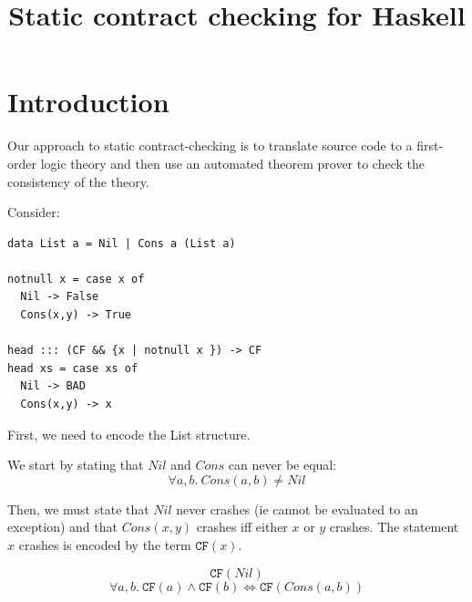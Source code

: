 \documentclass[preprint]{sigplanconf}
\begin{document}
\newcommand{\etrans}[1]{\mathcal{E} \llbracket #1 \rrbracket}
\newcommand{\dtrans}[1]{\mathcal{D} \llbracket #1 \rrbracket}
\newcommand{\ttrans}[1]{\mathcal{T} \llbracket #1 \rrbracket}
\newcommand{\strans}[1]{\mathcal{S} \llbracket #1 \rrbracket}
\newcommand{\trans}[1]{\llbracket #1 \rrbracket}

\newcommand{\tot}{\leftrightarrow}

\newcommand{\unr}{\texttt{UNR}}
\newcommand{\bad}{\texttt{BAD}}
\newcommand{\any}{\texttt{Any}}
\newcommand{\ok}{\texttt{Ok}}
\newcommand{\hprime}{\mathcal{H}'}
\newcommand{\cfc}{\texttt{CF}}
\newcommand{\cf}[1]{\texttt{CF}(#1)}
\newcommand{\weak}[1]{\mbox{$\$$weak}(#1)}
\renewcommand{\min}[1]{\mbox{min}(#1)}


\title{Static contract checking for Haskell}
\maketitle

\section{Introduction}

Our approach to static contract-checking is to translate source code
to a first-order logic theory and then use an automated theorem prover
to check the consistency of the theory.

Consider:
\begin{verbatim}
data List a = Nil | Cons a (List a)

notnull x = case x of
  Nil -> False
  Cons(x,y) -> True

head ::: (CF && {x | notnull x }) -> CF
head xs = case xs of
  Nil -> BAD
  Cons(x,y) -> x
\end{verbatim}

First, we need to encode the List structure. 

We start by stating that $Nil$ and $Cons$ can never be equal:
\begin{equation*}
\forall a,b.~Cons(a,b) \neq Nil
\end{equation*}

Then, we must state that $Nil$ never crashes (ie cannot be evaluated
to an exception) and that $Cons(x,y)$ crashes iff either $x$ or $y$
crashes. The statement $x$ crashes is encoded by the term $\cf{x}$.

\begin{equation*}
\cf{Nil}
\end{equation*}
\begin{equation}
  \label{cfcons}
\forall a,b.~\cf{a} \land \cf{b} \iff \cf{Cons(a,b)}
\end{equation}
\end{document}
